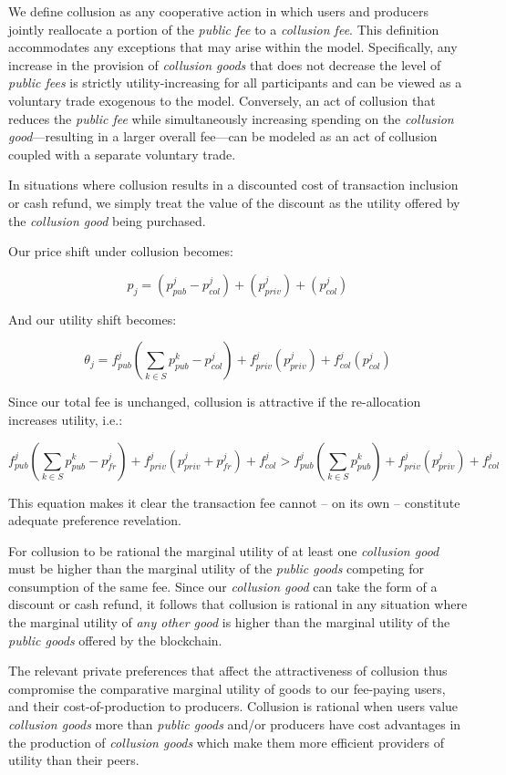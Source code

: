 \documentclass[oneside]{article}   	%
\begin{document}
We define collusion as any cooperative action in which users and producers jointly reallocate a portion of the \textit{public fee} to a \textit{collusion fee}. This definition accommodates any exceptions that may arise within the model. Specifically, any increase in the provision of \textit{collusion goods} that does not decrease the level of \textit{public fees} is strictly utility-increasing for all participants and can be viewed as a voluntary trade exogenous to the model. Conversely, an act of collusion that reduces the \textit{public fee} while simultaneously increasing spending on the \textit{collusion good}—resulting in a larger overall fee—can be modeled as an act of collusion coupled with a separate voluntary trade.

In situations where collusion results in a discounted cost of transaction inclusion or cash refund, we simply treat the value of the discount as the utility offered by the \textit{collusion good} being purchased.

Our price shift under collusion becomes:

$$
p_j = \left( p_{pub}^j - p_{col}^j \right) + \left( p_{priv}^j \right) + \left( p_{col}^j \right)
$$

And our utility shift becomes:

$$
\theta_j = f_{pub}^j\left(\sum_{k \in S} p_{pub}^{k} - p_{col}^j \right) + f_{priv}^j\left( p_{priv}^j \right) + f_{col}^j\left(p_{col}^j \right)
$$

Since our total fee is unchanged, collusion is attractive if the re-allocation increases utility, i.e.:

\[
f_{pub}^j\left(\sum_{k \in S} p_{pub}^{k} - p_{fr}^j \right) + f_{priv}^j( p_{priv}^j + p_{fr}^j ) + f_{col}^j
>
f_{pub}^j\left(\sum_{k \in S} p_{pub}^{k}\right) + f_{priv}^j(p_{priv}^j) + f_{col}^j
\]

This equation makes it clear the transaction fee cannot -- on its own -- constitute adequate preference revelation.

For collusion to be rational the marginal utility of at least one \textit{collusion good} must be higher than the marginal utility of the \textit{public goods} competing for consumption of the same fee. Since our \textit{collusion good} can take the form of a discount or cash refund, it follows that collusion is rational in any situation where the marginal utility of \textit{any other good} is higher than the marginal utility of the \textit{public goods} offered by the blockchain.

The relevant private preferences that affect the attractiveness of collusion thus compromise the comparative marginal utility of goods to our fee-paying users, and their cost-of-production to producers. Collusion is rational when users value \textit{collusion goods} more than \textit{public goods} and/or producers have cost advantages in the production of \textit{collusion goods} which make them more efficient providers of utility than their peers.
\end{document}
